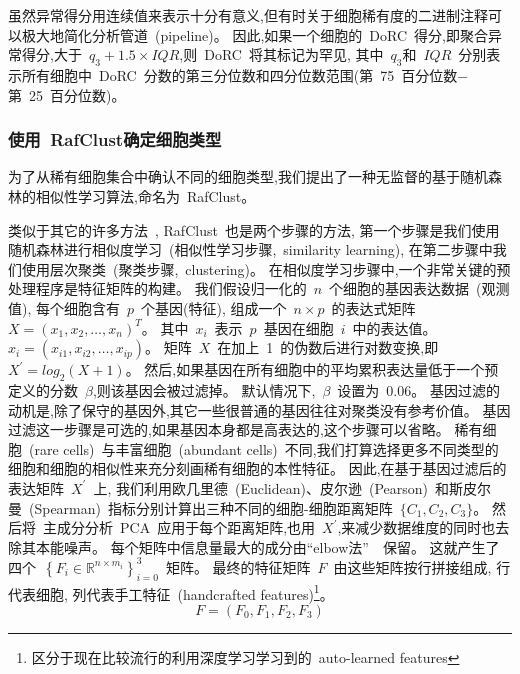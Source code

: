 虽然异常得分用连续值来表示十分有意义,但有时关于细胞稀有度的二进制注释可以极大地简化分析管道~(pipeline)。
因此,如果一个细胞的~DoRC~得分,即聚合异常得分,大于~$q_3 + 1.5 \times IQR$,则~DoRC~将其标记为罕见,
其中~$q_3$和~$IQR$~分别表示所有细胞中~DoRC~分数的第三分位数和四分位数范围(第~75~百分位数$-$第~25~百分位数)。

\subsubsection{使用~RafClust确定细胞类型}
\label{subsec:rafclust} 
为了从稀有细胞集合中确认不同的细胞类型,我们提出了一种无监督的基于随机森林的相似性学习算法,命名为~RafClust。

类似于其它的许多方法~\cite{kiselev2017sc3,pouyan2018random,mohammadi2018geometric,sinha2018dropclust,Srinivasan511626,Li530378,zheng2019sinnlrr},
RafClust~也是两个步骤的方法,
第一个步骤是我们使用随机森林进行相似度学习~(相似性学习步骤,~similarity learning),
在第二步骤中我们使用层次聚类~(聚类步骤,~clustering)。
在相似度学习步骤中,一个非常关键的预处理程序是特征矩阵的构建。
我们假设归一化的~$n$~个细胞的基因表达数据~(观测值), 每个细胞含有~$p$~个基因(特征),
组成一个~$n \times p$~的表达式矩阵~$X=\left(x_{1}, x_{2}, \ldots, x_{n} \right)^ T$。
其中~$x_{i}$~表示~$p$~基因在细胞~$i$~中的表达值。
$x_{i}=\left(x_{i1}, x_{i2},\ldots, x_{ip} \right)$。
矩阵~$X$~在加上~1~的伪数后进行对数变换,即~$X^{\prime} = log_2 (X + 1)$。
然后,如果基因在所有细胞中的平均累积表达量低于一个预定义的分数~$\beta$,则该基因会被过滤掉。
默认情况下,~$\beta$~设置为~0.06。 
基因过滤的动机是,除了保守的基因外,其它一些很普通的基因往往对聚类没有参考价值。
基因过滤这一步骤是可选的,如果基因本身都是高表达的,这个步骤可以省略。
稀有细胞~(rare cells)~与丰富细胞~(abundant cells)~不同,我们打算选择更多不同类型的细胞和细胞的相似性来充分刻画稀有细胞的本性特征。
因此,在基于基因过滤后的表达矩阵~$X^{\prime}$~上,
我们利用欧几里德~(Euclidean)、皮尔逊~(Pearson)~和斯皮尔曼~(Spearman)~指标分别计算出三种不同的细胞-细胞距离矩阵~$\{C_1, C_2, C_3\}$。
然后将~主成分分析~PCA~应用于每个距离矩阵,也用~$X^{\prime}$,来减少数据维度的同时也去除其本能噪声。
每个矩阵中信息量最大的成分由``elbow法''~\cite{thorndike1953belongs}~保留。
这就产生了四个~$\left\{ {F}_{i} \in \mathbb {R} ^ {n \times m_{i}} \right\}_{i = 0}^{3}$~矩阵。
最终的特征矩阵~$F$~由这些矩阵按行拼接组成, 行代表细胞, 列代表手工特征~(handcrafted features)\footnote{区分于现在比较流行的利用深度学习学习到的~auto-learned features}。
\begin{equation}
\label{lab:f}
{F} = ({F}_{0}, {F}_{1}, {F}_{2}, {F}_{3})
\end{equation}

